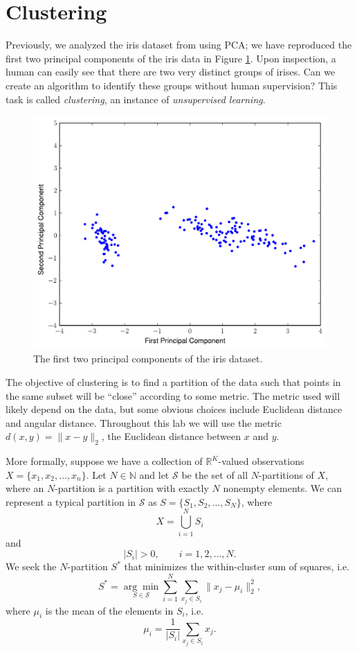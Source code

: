 
\section*{Clustering}

Previously, we analyzed the iris dataset from  using PCA; we have reproduced the first two principal components of the iris data in Figure \ref{fig:iris_data}.
Upon inspection, a human can easily see that there are two very distinct groups of irises.
Can we create an algorithm to identify these groups without human supervision?
This task is called \emph{clustering}, an instance of \emph{unsupervised learning}.

\begin{figure}
\centering
\includegraphics[width=.7\textwidth]{iris_pca.pdf}
\caption{The first two principal components of the iris dataset.}
\label{fig:iris_data}
\end{figure}

The objective of clustering is to find a partition of the data such that points in the same subset will be ``close'' according to some metric.
The metric used will likely depend on the data, but some obvious choices include Euclidean distance and angular distance.
Throughout this lab we will use the metric $d(x,y) = \|x-y\|_2$, the Euclidean distance between $x$ and $y$.

More formally, suppose we have a collection of $\mathbb{R}^K$-valued observations $X = \{x_1,x_2,\ldots,x_n\}$.
Let $N \in \mathbb{N}$ and let $\mathcal{S}$ be the set of all $N$-partitions of $X$, where an $N$-partition is a partition with exactly $N$ nonempty elements.
We can represent a typical partition in $\mathcal{S}$ as $S = \{S_1,S_2,\ldots,S_N\}$, where
\[
X = \bigcup_{i=1}^N S_i
\]
and
\[
|S_i| > 0, \qquad i=1,2,\ldots,N.
\]
We seek the $N$-partition $S^*$ that minimizes the within-cluster sum of squares, i.e.
\[
S^* = \underset{S\in\mathcal{S}}{\arg\min} \sum_{i=1}^N\sum_{x_j\in S_i}\|x_j-\mu_i\|_2^2,
\]
where $\mu_i$ is the mean of the elements in $S_i$, i.e.
\[
\mu_i = \frac{1}{|S_i|}\sum_{x_j\in S_i}x_j.
\]

